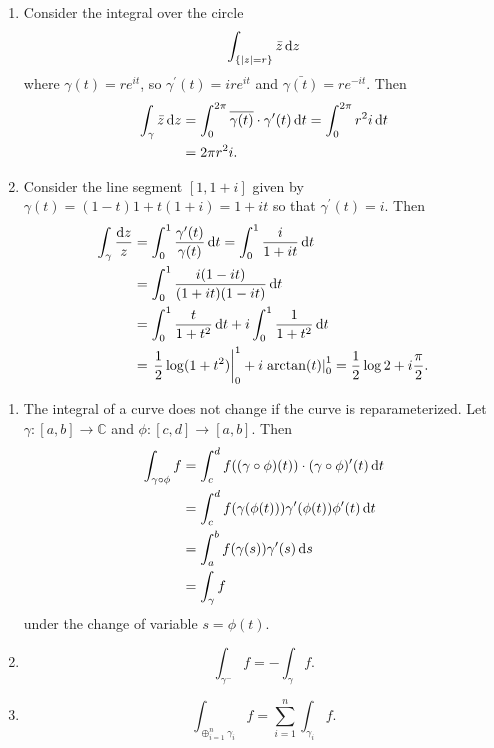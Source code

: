 \begin{xmpl}
  \begin{enumerate}
    \item{
      Consider the integral over the circle
      $$
      \int_{\{|z| = r\}} \bar{z} \mathop{}\!\mathrm{d} z
      $$
      where $\gamma(t) = re^{it}$, so
      $\gamma^\prime(t) = i r e^{it}$
      and $\bar{\gamma(t)} = re^{-it}$. Then
      \begin{align*}
         \int_\gamma \bar{z} \mathop{}\!\mathrm{d} z
      &= \int_0^{2\pi}
          \overline{\gamma(t)} \cdot \gamma^\prime(t) \mathop{}\!\mathrm{d} t
       = \int_0^{2\pi} r^2 i \mathop{}\!\mathrm{d} t \\
      &= 2 \pi r^2 i.
      \end{align*}
    }
    \item{
      Consider the line segment $[1, 1+i]$ given by
      $\gamma(t) = (1-t)1 + t(1+i) = 1 + it$
      so that $\gamma^\prime(t) = i$.
      Then
      \begin{align*}
         \int_\gamma \frac{\mathop{}\!\mathrm{d} z}{z}
      &= \int_0^1 \frac{\gamma^\prime(t)}{\gamma(t)} \mathop{}\!\mathrm{d} t
       = \int_0^1 \frac{i}{1 + it} \mathop{}\!\mathrm{d} t \\
      &= \int_0^1 \frac{i(1 - it)}{(1+it)(1-it)} \mathop{}\!\mathrm{d} t \\
      &= \int_0^1 \frac{t}{1 + t^2} \mathop{}\!\mathrm{d} t
       + i \int_0^1 \frac{1}{1 + t^2} \mathop{}\!\mathrm{d} t \\
      &= \left.\frac{1}{2} \log (1 + t^2)\right|_0^1
       + i\left.\arctan(t)\right|_0^1
       = \frac{1}{2} \log 2 + i \frac{\pi}{2}.
      \end{align*}
    }
  \end{enumerate}
\end{xmpl}

\begin{obsv}
  \begin{enumerate}
    \item{
      The integral of a curve does not change if the curve is
      reparameterized. Let $\gamma : [a, b] \to \mathbb{C}$ and
      $\phi : [c, d] \to [a, b]$. Then
      \begin{align*}
         \int_{\gamma \circ \phi} f
      &= \int_c^d
           f((\gamma \circ \phi)(t)) \cdot
           (\gamma \circ \phi)^\prime(t)
           \mathop{}\!\mathrm{d} t \\
      &= \int_c^d
           f(\gamma(\phi(t)))
           \gamma^\prime(\phi(t))
           \phi^\prime(t)
           \mathop{}\!\mathrm{d} t \\
      &= \int_a^b
           f(\gamma(s)) \gamma^\prime(s) \mathop{}\!\mathrm{d} s \\
      &= \int_\gamma f
      \end{align*}
      under the change of variable $s = \phi(t)$.
    }
    \item{
      $$
      \int_{\gamma^{-}} f = -\int_{\gamma} f.
      $$
    }
    \item{
      $$
        \int_{\oplus_{i=1}^n \gamma_i} f
      = \sum_{i=1}^n \int_{\gamma_i} f.
      $$
    }
  \end{enumerate}
\end{obsv}


